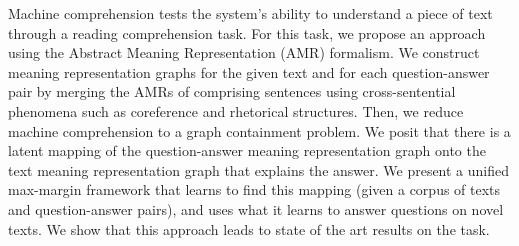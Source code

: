 Machine comprehension tests the system's ability to understand a piece of text through a reading comprehension task. For this task, we propose an approach using the Abstract Meaning Representation (AMR) formalism. We construct meaning representation graphs for the given text and for each question-answer pair by merging the AMRs of comprising sentences using cross-sentential phenomena such as coreference and rhetorical structures. Then, we reduce machine comprehension to a graph containment problem. We posit that there is a latent mapping of the question-answer meaning representation graph onto the text meaning representation graph that explains the answer. We present a unified max-margin framework that learns to find this mapping (given a corpus of texts and question-answer pairs), and uses what it learns to answer questions on novel texts. We show that this approach leads to state of the art results on the task.
